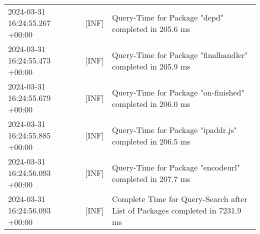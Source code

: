 {{\begin{tabularx}{\textwidth}{|l|l|X|}
                    2024-03-31 16:24:55.267 +00:00 & [INF] & Query-Time for Package "depd" completed in 205.6 ms \\
                    2024-03-31 16:24:55.473 +00:00 & [INF] & Query-Time for Package "finalhandler" completed in 205.9 ms \\
                    2024-03-31 16:24:55.679 +00:00 & [INF] & Query-Time for Package "on-finished" completed in 206.0 ms \\
                    2024-03-31 16:24:55.885 +00:00 & [INF] & Query-Time for Package "ipaddr.js" completed in 206.5 ms \\
                    2024-03-31 16:24:56.093 +00:00 & [INF] & Query-Time for Package "encodeurl" completed in 207.7 ms \\
                    2024-03-31 16:24:56.093 +00:00 & [INF] & Complete Time for Query-Search after List of Packages completed in 7231.9 ms \\
                    \hline
                \end{tabularx}
            }
        }

